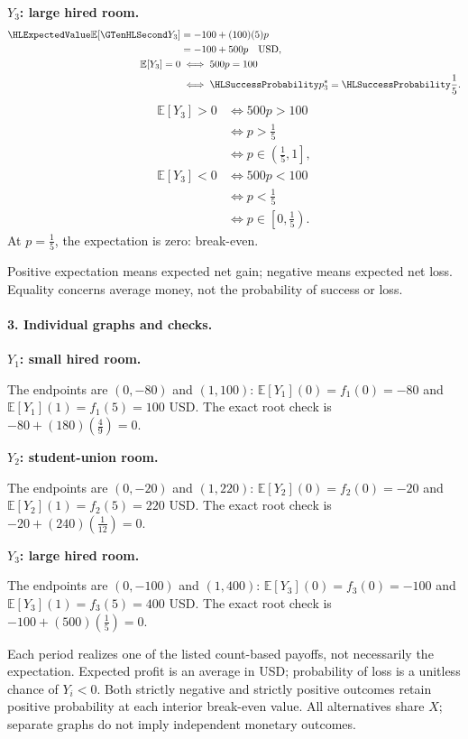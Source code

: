 \par\noindent\begin{minipage}[t]{.48\linewidth}\vspace{0pt}
\textbf{$Y_3$: large hired room.}
\[
\begin{aligned}
\ExpectedValue{\mathbb E}[\Money{Y_3}]&=-100+(100)(5)p\\
&=-100+500p\quad\text{USD},\\
\mathbb E[Y_3]=0&\iff 500p=100\\
&\iff \SuccessProb{p_3^*}=\SuccessProb{\frac{1}{5}}.
\end{aligned}
\]
\[
\begin{aligned}
\mathbb E[Y_3]>0&\iff 500p>100\\
&\iff p>\frac{1}{5}\\
&\iff p\in \left(\frac{1}{5},1\right],\\
\mathbb E[Y_3]<0&\iff 500p<100\\
&\iff p<\frac{1}{5}\\
&\iff p\in \left[0,\frac{1}{5}\right).
\end{aligned}
\]
At $p=\frac{1}{5}$, the expectation is zero: break-even.
\end{minipage}\par
Positive expectation means expected net gain; negative means expected net loss. Equality concerns average money, not the probability of success or loss.
\clearpage\paragraph{3. Individual graphs and checks.}
\textbf{$Y_1$: small hired room.}
\begin{center}\end{center}
The endpoints are $(0,-80)$ and $(1,100)$: $\mathbb E[Y_1](0)=f_1(0)=-80$ and
$\mathbb E[Y_1](1)=f_1(5)=100$ USD.
The exact root check is $-80+(180)(\frac{4}{9})=0$.
\par\medskip
\textbf{$Y_2$: student-union room.}
\begin{center}\end{center}
The endpoints are $(0,-20)$ and $(1,220)$: $\mathbb E[Y_2](0)=f_2(0)=-20$ and
$\mathbb E[Y_2](1)=f_2(5)=220$ USD.
The exact root check is $-20+(240)(\frac{1}{12})=0$.
\par\medskip
\clearpage
\textbf{$Y_3$: large hired room.}
\begin{center}\end{center}
The endpoints are $(0,-100)$ and $(1,400)$: $\mathbb E[Y_3](0)=f_3(0)=-100$ and
$\mathbb E[Y_3](1)=f_3(5)=400$ USD.
The exact root check is $-100+(500)(\frac{1}{5})=0$.
\par\medskip
Each period realizes one of the listed count-based payoffs, not necessarily the expectation.
Expected profit is an average in USD; probability of loss is a unitless chance of $Y_i<0$.
Both strictly negative and strictly positive outcomes retain positive probability at each interior break-even value.
All alternatives share $X$; separate graphs do not imply independent monetary outcomes.
\clearpage
